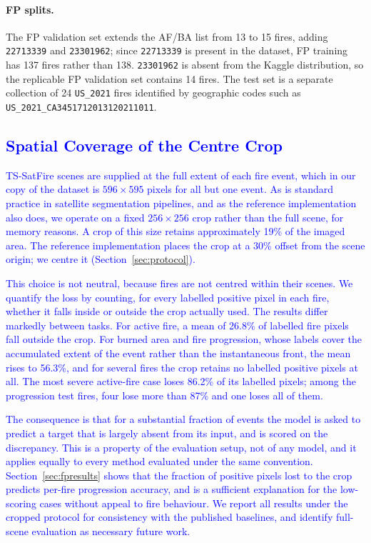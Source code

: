 \documentclass[sensors,article,submit,moreauthors,pdftex]{Definitions/mdpi}
\newcommand{\rev}[1]{\textcolor{blue}{#1}}
\begin{document}
\paragraph*{FP splits.} The FP validation set extends the AF/BA list from 13 to 15 fires, adding 
\texttt{22713339} and \texttt{23301962}; since \texttt{22713339} is present 
in the dataset, FP training has 137 fires rather than 138. \texttt{23301962} 
is absent from the Kaggle distribution, so the replicable FP validation set 
contains 14 fires. The test set is a separate collection of 24 \texttt{US\_2021} 
fires identified by geographic codes such as \texttt{US\_2021\_CA3451712013120211011}.

\subsection{\rev{Spatial Coverage of the Centre Crop}}
\label{sec:crop}

\rev{TS-SatFire scenes are supplied at the full extent of each fire event, which
in our copy of the dataset is $596 \times 595$ pixels for all but one event. As is
standard practice in satellite segmentation pipelines, and as the reference
implementation also does, we operate on a fixed $256 \times 256$ crop rather
than the full scene, for memory reasons. A crop of this size retains
approximately 19\% of the imaged area. The reference implementation places the
crop at a 30\% offset from the scene origin; we centre it
(Section~\ref{sec:protocol}).}

\rev{This choice is not neutral, because fires are not centred within their
scenes. We quantify the loss by counting, for every labelled positive pixel in
each fire, whether it falls inside or outside the crop actually used. The
results differ markedly between tasks. For active fire, a mean of 26.8\% of
labelled fire pixels fall outside the crop. For burned area and fire
progression, whose labels cover the accumulated extent of the event rather than
the instantaneous front, the mean rises to 56.3\%, and for several fires the crop retains no
labelled positive pixels at all. The most severe active-fire case loses 86.2\%
of its labelled pixels; among the progression test fires, four lose more than
87\% and one loses all of them.}

\rev{The consequence is that for a substantial fraction of events the model is
asked to predict a target that is largely absent from its input, and is scored
on the discrepancy. This is a property of the evaluation setup, not of any model, and it applies equally to every method evaluated under the same convention. Section~\ref{sec:fpresults} shows that the fraction of positive
pixels lost to the crop predicts per-fire progression accuracy, and is a
sufficient explanation for the low-scoring cases without appeal to fire
behaviour. We report all results under the cropped protocol for consistency with
the published baselines, and identify full-scene evaluation as necessary future
work.}
\end{document}
